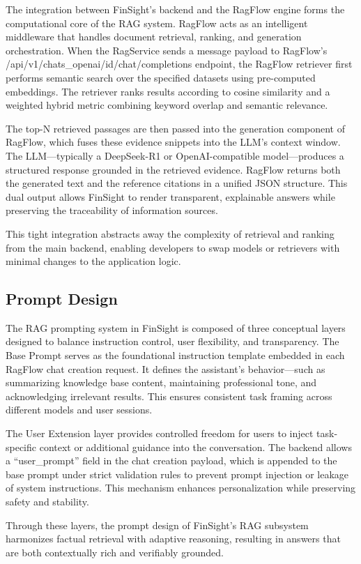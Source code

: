 The integration between FinSight’s backend and the RagFlow engine forms the computational core of the RAG system. RagFlow acts as an intelligent middleware that handles document retrieval, ranking, and generation orchestration. When the RagService sends a message payload to RagFlow’s /api/v1/chats\_openai/{id}/chat/completions endpoint, the RagFlow retriever first performs semantic search over the specified datasets using pre-computed embeddings. The retriever ranks results according to cosine similarity and a weighted hybrid metric combining keyword overlap and semantic relevance.

The top-N retrieved passages are then passed into the generation component of RagFlow, which fuses these evidence snippets into the LLM’s context window. The LLM---typically a DeepSeek-R1 or OpenAI-compatible model---produces a structured response grounded in the retrieved evidence. RagFlow returns both the generated text and the reference citations in a unified JSON structure. This dual output allows FinSight to render transparent, explainable answers while preserving the traceability of information sources.

This tight integration abstracts away the complexity of retrieval and ranking from the main backend, enabling developers to swap models or retrievers with minimal changes to the application logic.

\subsection{Prompt Design}
The RAG prompting system in FinSight is composed of three conceptual layers designed to balance instruction control, user flexibility, and transparency.
The Base Prompt serves as the foundational instruction template embedded in each RagFlow chat creation request. It defines the assistant’s behavior---such as summarizing knowledge base content, maintaining professional tone, and acknowledging irrelevant results. This ensures consistent task framing across different models and user sessions.

The User Extension layer provides controlled freedom for users to inject task-specific context or additional guidance into the conversation. The backend allows a “user\_prompt” field in the chat creation payload, which is appended to the base prompt under strict validation rules to prevent prompt injection or leakage of system instructions. This mechanism enhances personalization while preserving safety and stability.

Through these layers, the prompt design of FinSight’s RAG subsystem harmonizes factual retrieval with adaptive reasoning, resulting in answers that are both contextually rich and verifiably grounded.

















